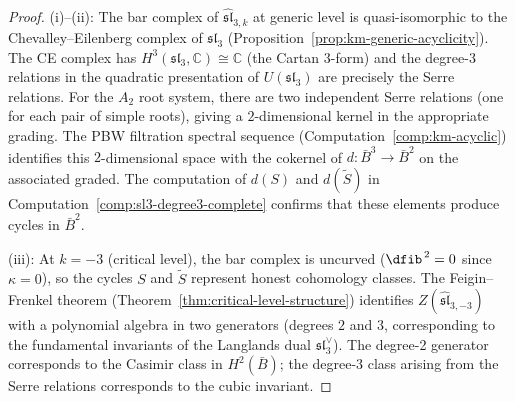 \begin{proof}
(i)--(ii): The bar complex of $\widehat{\mathfrak{sl}}_{3,k}$ at
generic level is quasi-isomorphic to the Chevalley--Eilenberg complex of
$\mathfrak{sl}_3$ (Proposition~\ref{prop:km-generic-acyclicity}).  The
CE complex has $H^3(\mathfrak{sl}_3, \mathbb{C}) \cong \mathbb{C}$
(the Cartan $3$-form) and the degree-3 relations in the quadratic
presentation of $U(\mathfrak{sl}_3)$ are precisely the Serre relations.
For the $A_2$ root system, there are two independent Serre relations
(one for each pair of simple roots), giving a $2$-dimensional kernel
in the appropriate grading.  The PBW filtration spectral sequence
(Computation~\ref{comp:km-acyclic}) identifies this $2$-dimensional
space with the cokernel of $d\colon \bar{B}^3 \to \bar{B}^2$ on the
associated graded.  The computation of $d(S)$ and $d(\tilde{S})$ in
Computation~\ref{comp:sl3-degree3-complete} confirms that these
elements produce cycles in $\bar{B}^2$.

(iii): At $k = -3$ (critical level), the bar complex is uncurved ($\dfib^{\,2} = 0$ since $\kappa = 0$),
so the cycles $S$ and $\tilde{S}$ represent honest cohomology classes.
The Feigin--Frenkel theorem (Theorem~\ref{thm:critical-level-structure})
identifies $Z(\widehat{\mathfrak{sl}}_{3,-3})$ with a polynomial algebra
in two generators (degrees $2$ and $3$, corresponding to the fundamental
invariants of the Langlands dual $\mathfrak{sl}_3^\vee$).  The degree-2
generator corresponds to the Casimir class in $H^2(\bar{B})$; the
degree-3 class arising from the Serre relations corresponds to the
cubic invariant.
\end{proof}

